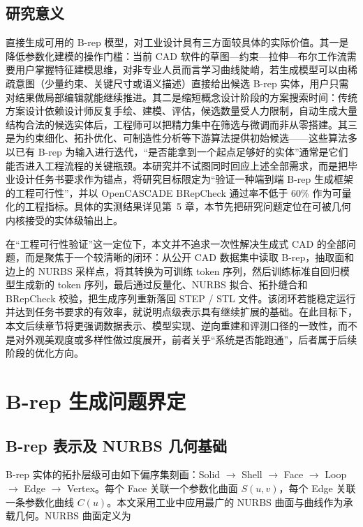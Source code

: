 \subsection{研究意义}

直接生成可用的 B-rep 模型，对工业设计具有三方面较具体的实际价值。其一是降低参数化建模的操作门槛：当前 CAD 软件的草图—约束—拉伸—布尔工作流需要用户掌握特征建模思维，对非专业人员而言学习曲线陡峭，若生成模型可以由稀疏意图（少量约束、关键尺寸或语义描述）直接给出候选 B-rep 实体，用户只需对结果做局部编辑就能继续推进。其二是缩短概念设计阶段的方案搜索时间：传统方案设计依赖设计师反复手绘、建模、评估，候选数量受人力限制，自动生成大量结构合法的候选实体后，工程师可以把精力集中在筛选与微调而非从零搭建。其三是为约束细化、拓扑优化、可制造性分析等下游算法提供初始候选——这些算法多以已有 B-rep 为输入进行迭代，“是否能拿到一个起点足够好的实体”通常是它们能否进入工程流程的关键瓶颈。本研究并不试图同时回应上述全部需求，而是把毕业设计任务书要求作为锚点，将研究目标限定为“验证一种端到端 B-rep 生成框架的工程可行性”，并以 OpenCASCADE BRepCheck 通过率不低于 60\% 作为可量化的工程指标。具体的实测结果详见第~5 章，本节先把研究问题定位在可被几何内核接受的实体级输出上。

在“工程可行性验证”这一定位下，本文并不追求一次性解决生成式 CAD 的全部问题，而是聚焦于一个较清晰的闭环：从公开 CAD 数据集中读取 B-rep，抽取面和边上的 NURBS 采样点，将其转换为可训练 token 序列，然后训练标准自回归模型生成新的 token 序列，最后通过反量化、NURBS 拟合、拓扑缝合和 BRepCheck 校验，把生成序列重新落回 STEP / STL 文件。该闭环若能稳定运行并达到任务书要求的有效率，就说明点级表示具有继续扩展的基础。在此目标下，本文后续章节将更强调数据表示、模型实现、逆向重建和评测口径的一致性，而不是对外观美观度或多样性做过度展开，前者关乎“系统是否能跑通”，后者属于后续阶段的优化方向。

\section{B-rep 生成问题界定}

\subsection{B-rep 表示及 NURBS 几何基础}

B-rep 实体的拓扑层级可由如下偏序集刻画：Solid $\to$ Shell $\to$ Face $\to$ Loop $\to$ Edge $\to$ Vertex。每个 Face 关联一个参数化曲面 $S(u, v)$，每个 Edge 关联一条参数化曲线 $C(u)$。本文采用工业中应用最广的 NURBS 曲面与曲线作为承载几何\cite{piegl_tiller_1997_nurbs}。NURBS 曲面定义为

